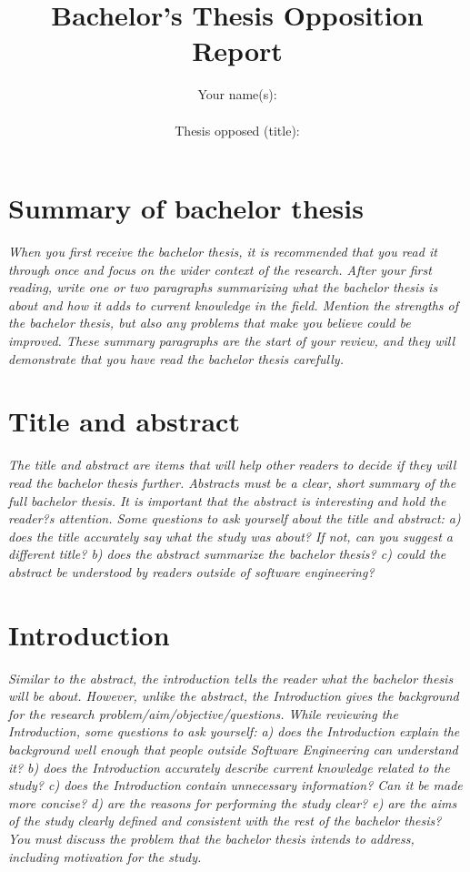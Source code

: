 \documentclass[conference]{IEEEtran}
\begin{document}
\title{Bachelor's Thesis Opposition Report}

\author{Your name(s): \\ \\
Thesis opposed (title):
}

\maketitle


\section{Summary of bachelor thesis}
\textit{When you first receive the bachelor thesis, it is recommended that you read it through once and focus on the wider context of the research. After your first reading, write one or two paragraphs summarizing what the bachelor thesis is about and how it adds to current knowledge in the field. Mention the strengths of the bachelor thesis, but also any problems that make you believe could be improved. These summary paragraphs are the start of your review, and they will demonstrate that you have read the bachelor thesis carefully.}

\section{Title and abstract}
\textit{The title and abstract are items that will help other readers to decide if they will read the bachelor thesis further. Abstracts must be a clear, short summary of the full bachelor thesis. It is important that the abstract is interesting and hold the reader?s attention. Some questions to ask yourself about the title and abstract: a) does the title accurately say what the study was about? If not, can you suggest a different title? b) does the abstract summarize the bachelor thesis? c) could the abstract be understood by readers outside of software engineering?}


\section{Introduction}
\textit{Similar to the abstract, the introduction tells the reader what the bachelor thesis will be about. However, unlike the abstract, the Introduction gives the background for the research problem/aim/objective/questions. While reviewing the Introduction, some questions to ask yourself: a) does the Introduction explain the background well enough that people outside Software Engineering can understand it? b) does the Introduction accurately describe current knowledge related to the study? c) does the Introduction contain unnecessary information? Can it be made more concise? d) are the reasons for performing the study clear? e) are the aims of the study clearly defined and consistent with the rest of the bachelor thesis? You must discuss the problem that the bachelor thesis intends to address, including motivation for the study.}
\end{document}
